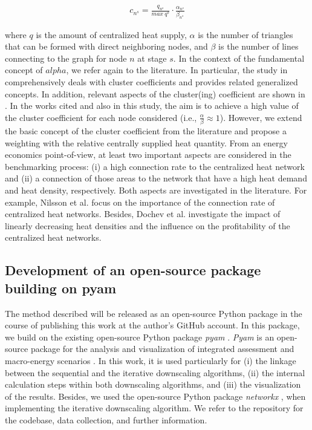 \begin{align}\label{eq:2}
c_{n^{s}}=\frac{q_{n^{s}}}{max~q^{s}}\cdot \frac{\alpha_{n^{s}}}{\beta_{n^{s}}}
\end{align}

where $q$ is the amount of centralized heat supply, $\alpha$ is the number of triangles that can be formed with direct neighboring nodes, and $\beta$ is the number of lines connecting to the graph for node $n$ at stage $s$. In the context of the fundamental concept of $alpha$, we refer again to the literature. In particular, the study in \cite{huang2010link} comprehensively deals with cluster coefficients and provides related generalized concepts. In addition, relevant aspects of the cluster(ing) coefficient are shown in \cite{cui2014detecting}. In the works cited and also in this study, the aim is to achieve a high value of the cluster coefficient for each node considered (i.e., $\frac{\alpha}{\beta} \approx 1$). However, we extend the basic concept of the cluster coefficient from the literature and propose a weighting with the relative centrally supplied heat quantity. From an energy economics point-of-view, at least two important aspects are considered in the benchmarking process: (i) a high connection rate to the centralized heat network and (ii) a connection of those areas to the network that have a high heat demand and heat density, respectively. Both aspects are investigated in the literature. For example, Nilsson et al. \cite{nilsson2008sparse} focus on the importance of the connection rate of centralized heat networks. Besides, Dochev et al. \cite{dochev2018analysing} investigate the impact of linearly decreasing heat densities and the influence on the profitability of the centralized heat networks.

\subsection{Development of an open-source package building on pyam}\label{open}
The method described will be released as an open-source Python package in the course of publishing this work at the author's GitHub account. In this package, we build on the existing open-source Python package \textit{pyam} \cite{gidden2019pyam}. \textit{Pyam} is an open-source package for the analysis and visualization of integrated assessment and macro-energy scenarios \cite{huppmann2021pyam}. In this work, it is used particularly for (i) the linkage between the sequential and the iterative downscaling algorithms, (ii) the internal calculation steps within both downscaling algorithms, and (iii) the visualization of the results. Besides, we used the open-source Python package \textit{networkx} \cite{hagberg2008exploring}, when implementing the iterative downscaling algorithm. We refer to the repository for the codebase, data collection, and further information. 
